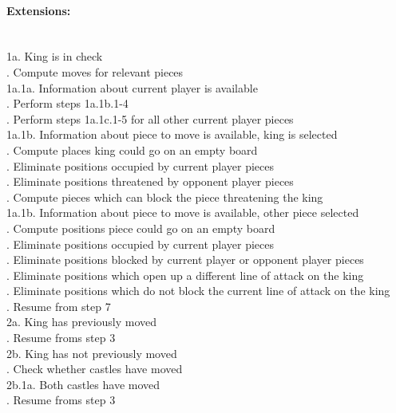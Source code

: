 \documentclass{article}
\begin{document}
\paragraph{Extensions:}\mbox{}\\
1a. King is in check\\
. Compute moves for relevant pieces\\
\indent\indent1a.1a. Information about current player is available\\
\indent\indent{}. Perform steps 1a.1b.1-4\\
\indent\indent{}. Perform steps 1a.1c.1-5 for all other current player pieces\\
\indent\indent1a.1b. Information about piece to move is available, king is selected\\
\indent\indent{}. Compute places king could go on an empty board\\
\indent\indent{}. Eliminate positions occupied by current player pieces\\
\indent\indent{}. Eliminate positions threatened by opponent player pieces\\
\indent\indent{}. Compute pieces which can block the piece threatening the king\\
\indent\indent1a.1b. Information about piece to move is available, other piece selected\\
\indent\indent{}. Compute positions piece could go on an empty board\\
\indent\indent{}. Eliminate positions occupied by current player pieces\\
\indent\indent{}. Eliminate positions blocked by current player or opponent player pieces\\
\indent\indent{}. Eliminate positions which open up a different line of attack on the king\\
\indent\indent{}. Eliminate positions which do not block the current line of attack on the king\\
. Resume from step 7\\
2a. King has previously moved\\
. Resume froms step 3\\
2b. King has not previously moved\\
. Check whether castles have moved\\
\indent\indent2b.1a. Both castles have moved\\
\indent\indent{}. Resume froms step 3\\
\end{document}
